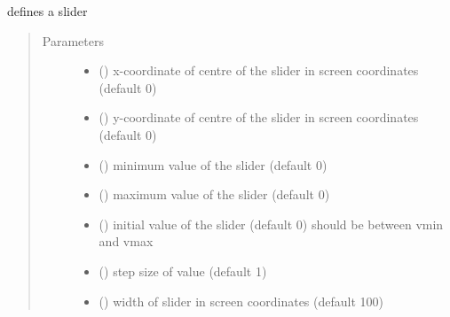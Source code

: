 \documentclass[letterpaper,10pt,english]{sphinxmanual}
\begin{document}

\begin{fulllineitems}
\label{\detokenize{Reference:salabim.AnimateSlider}}
defines a slider
\begin{quote}\begin{description}
\item[{Parameters}] \leavevmode\begin{itemize}
\item {} 
 () \textendash{} x-coordinate of centre of the slider in screen coordinates (default 0)

\item {} 
 () \textendash{} y-coordinate of centre of the slider in screen coordinates (default 0)

\item {} 
 () \textendash{} minimum value of the slider (default 0)

\item {} 
 () \textendash{} maximum value of the slider (default 0)

\item {} 
 () \textendash{} initial value of the slider (default 0) 
should be between vmin and vmax

\item {} 
 () \textendash{} step size of value (default 1)

\item {} 
 () \textendash{} width of slider in screen coordinates (default 100)


\end{itemize}
\end{description}
\end{quote}
\end{fulllineitems}
\end{document}
